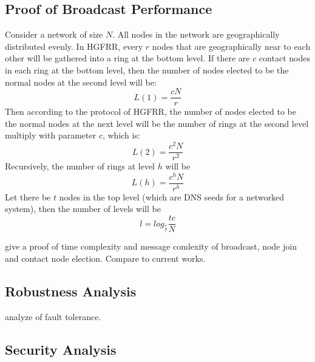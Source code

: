 \subsection{Proof of Broadcast Performance}

Consider a network of size $N$. All nodes in the network are geographically distributed evenly. In HGFRR, every $r$ nodes that are geographically near to each other will be gathered into a ring at the bottom level. If there are $c$ contact nodes in each ring at the bottom level, then the number of nodes elected to be the normal nodes at the second level will be: $$L(1) = \frac{cN}{r}$$ Then according to the protocol of HGFRR, the number of nodes elected to be the normal nodes at the next level will be the number of rings at the second level multiply with parameter $c$, which is: $$L(2) = \frac{c^2N}{r^2}$$ Recursively, the number of rings at level $h$ will be $$L(h) = \frac{c^hN}{r^h}$$ Let there be $t$ nodes in the top level (which are DNS seeds for a networked system), then the number of levels will be $$l = log_{\frac{c}{r}}{\frac{tc}{N}}$$

give a proof of time complexity and message comlexity of broadcast, node join and contact node election. Compare to current works.

\subsection{Robustness Analysis}

analyze of fault tolerance.

\subsection{Security Analysis}